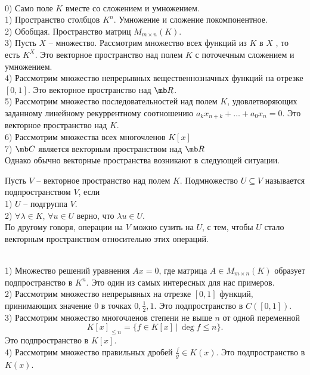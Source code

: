 \exm\\
0) Само поле $K$ вместе со сложением и умножением.\\
1) Пространство столбцов $K^n$. Умножение и сложение покомпонентное.\\
2) Обобщая. Пространство матриц $M_{m\times n}(K)$.\\
3) Пусть $X$ -- множество. Рассмотрим множество всех функций  из $K$ в $X$ , то есть $K^X$. Это векторное пространство над полем $K$ с поточечным сложением и умножением.\\
4) Рассмотрим множество непрерывных вещественнозначных функций на отрезке $[0,1]$. Это векторное пространство над $\mb R$.\\
5) Рассмотрим множество последовательностей над полем $K$, удовлетворяющих заданному линейному рекуррентному соотношению $a_k x_{n+k}+\dots+a_0x_n=0$. Это векторное пространство над $K$.\\
6) Рассмотрим множества всех многочленов $K[x]$\\
7) $\mb C$ является векторным пространством над $\mb R$\\



Однако обычно векторные пространства возникают в следующей ситуации.





\dfn[Подпространство] Пусть $V$ -- векторное пространство над полем $K$. Подмножество $U\subseteq V$ называется подпространством $V$, если\\
1) $U$ -- подгруппа $V$.\\
2) $\forall \lambda \in K$, $\forall u \in U$ верно, что $\lambda u \in U$.\\
По другому говоря,  операции на $V$ можно сузить на $U$, с тем, чтобы $U$ стало векторным пространством относительно этих операций.
\edfn

\exm\\
1) Множество решений уравнения $Ax=0$, где матрица $A \in M_{m \times n}(K)$ образует подпространство в $K^n$. Это один из самых интересных для нас примеров.\\
2) Рассмотрим множество непрерывных на отрезке $[0,1]$ функций, принимающих значение $0$  в точках $0, \frac{1}{2}, 1$. Это подпространство в $C([0,1])$.\\
3) Рассмотрим множество многочленов степени не выше $n$ от одной переменной $$K[x]_{\leq n}=\{ f \in K[x]\,|\, \deg f\leq n\}.$$ Это подпространство в  $K[x]$.\\
4) Рассмотрим множество правильных дробей $\frac{f}{g}\in K(x)$. Это подпространство в $K(x)$.\\

